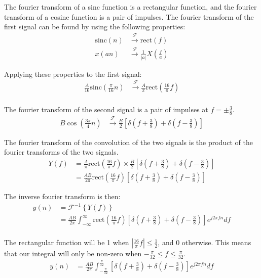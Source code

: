 \documentclass{article}
\begin{document}
The fourier transform of a sinc function is a rectangular function, and the fourier transform of a cosine function is a pair of impulses. The fourier transform of the first signal can be found by using the following properties:
\begin{align*}
    \text{sinc}(n) &\xrightarrow{\mathcal{F}} \text{rect}(f) \\
    x(an) &\xrightarrow{\mathcal{F}} \frac{1}{|a|}X\left(\frac{f}{a}\right)
\end{align*}

Applying these properties to the first signal:
\begin{align*}
    \frac{A}{16}\text{sinc}\left(\frac{\pi}{16}n\right) &\xrightarrow{\mathcal{F}} \frac{A}{\pi}\text{rect}\left(\frac{16}{\pi} f\right) \\
\end{align*}

The fourier transform of the second signal is a pair of impulses at $f = \pm \frac{3}{8}$.
\begin{align*}
    B\cos\left(\frac{3\pi}{4}n\right) &\xrightarrow{\mathcal{F}} \frac{B}{2}\left[\delta\left(f + \frac{3}{8}\right) + \delta\left(f - \frac{3}{8}\right)\right]
\end{align*}

The fourier transform of the convolution of the two signals is the product of the fourier transforms of the two signals.
\begin{align*}
    Y(f) &= \frac{A}{\pi}\text{rect}\left(\frac{16}{\pi} f\right) \times \frac{B}{2}\left[\delta\left(f + \frac{3}{8}\right) + \delta\left(f - \frac{3}{8}\right)\right] \\
    &= \frac{AB}{2\pi}\text{rect}\left(\frac{16}{\pi} f\right) \left[\delta\left(f + \frac{3}{8}\right) + \delta\left(f - \frac{3}{8}\right)\right]
\end{align*}

The inverse fourier transform is then:
\begin{align*}
    y(n) &= \mathcal{F}^{-1}\left\{Y(f)\right\} \\
    &= \frac{AB}{2\pi} \int_{-\infty}^{\infty} \text{rect}\left(\frac{16}{\pi} f\right) \left[\delta\left(f + \frac{3}{8}\right) + \delta\left(f - \frac{3}{8}\right)\right] e^{j2\pi fn} df \\
\end{align*}

The rectangular function will be 1 when $ \left|\frac{16}{\pi} f\right| \leq \frac{1}{2}$, and $0$ otherwise. This means that our integral will only be non-zero when $-\frac{\pi}{32} \leq f \leq \frac{\pi}{32}$. 
\begin{align*}
    y(n) &= \frac{AB}{2\pi} \int_{-\frac{\pi}{32}}^{\frac{\pi}{32}} \left[\delta\left(f + \frac{3}{8}\right) + \delta\left(f - \frac{3}{8}\right)\right] e^{j2\pi fn} df \\
\end{align*}
\end{document}
